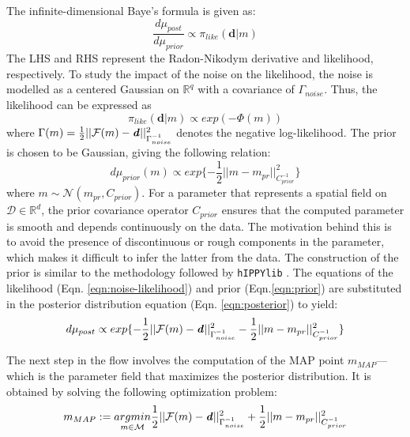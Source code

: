 The infinite-dimensional Baye's formula is given as:
\begin{equation}
    \label{eqn:posterior}
    \frac{d\mu_{post}}{d\mu_{prior}} \propto \pi_{like}(\textbf{d}|m)
\end{equation}
The LHS and RHS represent the Radon-Nikodym derivative \cite{williams1991probability} and likelihood, respectively. 
To study the impact of the noise on the likelihood, the noise is modelled as a centered Gaussian on $\mathbb{R}^q$ with a covariance of $\Gamma_{noise}$. Thus, the likelihood can be expressed as
\begin{equation}
    \label{eqn:noise-likelihood}
    \pi_{like}(\textbf{d}|m) \propto exp(-\Phi(m))
\end{equation}
where $\Gamma(m) = \frac{1}{2}||\mathcal{F}(m) - \textbf{\textit{d}}||^2_{\Gamma_{noise}^{-1}}$ denotes the negative log-likelihood.
The prior is chosen to be Gaussian, giving the following relation:
\begin{equation}
    \label{eqn:prior}
    d\mu_{prior}(m) \propto exp\{ -\frac{1}{2}|| m - m_{pr} ||^2_{C^{-1}_{prior}} \}
\end{equation}
where $m \sim \mathcal{N}(m_{pr}, C_{prior})$. For a parameter that represents a spatial field on $\mathcal{D} \in \mathbb{R}^d$, the prior covariance operator $C_{prior}$ ensures that the computed parameter is smooth and depends continuously on the data. The motivation behind this is to avoid the presence of discontinuous or rough components in the parameter, which makes it difficult to infer the latter from the data. The construction of the prior is similar to the methodology followed by \texttt{hIPPYlib} \cite{villa2018hippylib}.
The equations of the likelihood (Eqn. \eqref{eqn:noise-likelihood}) and prior (Eqn.\eqref{eqn:prior}) are substituted in the posterior distribution equation (Eqn. \eqref{eqn:posterior}) to yield:
\begin{equation}
    \label{eqn:posterior2}
    d\mu_{post} \propto exp \{ - \frac{1}{2}||\mathcal{F}(m) - \textbf{\textit{d}}||^2_{\Gamma^{-1}_{noise}} - \frac{1}{2}||m - m_{pr}||^2_{C^{-1}_{prior}} \}
\end{equation}

The next step in the flow involves the computation of the MAP point $m_{MAP}$---which is the parameter field that maximizes the posterior distribution. It is obtained by solving the following optimization problem:
\begin{equation}
    \label{eqn:map}
    m_{MAP} := \underset{m \in \mathcal{M}}{argmin}\frac{1}{2}||\mathcal{F}(m) - \textbf{\textit{d}}||^2_{\Gamma_{noise}^{-1}} + \frac{1}{2}||m - m_{pr}||^2_{C_{prior}^{-1}}
\end{equation}

